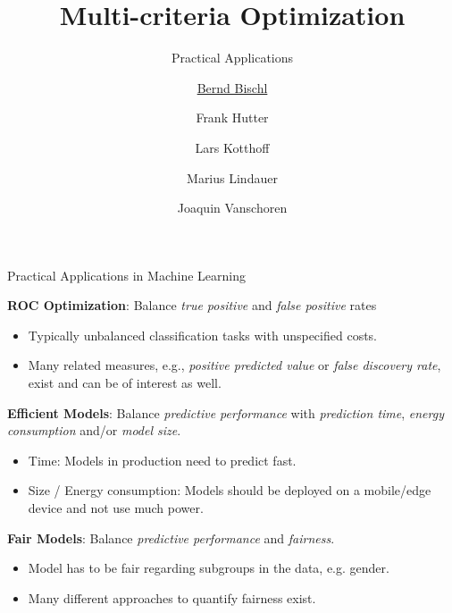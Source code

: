 


\newcommand{\q}[0]{\mathbf{q}}
\newcommand{\Xspace}[0]{\mathcal{X}}
\newcommand{\inducer}{\mathcal{I}}

\title[AutoML: Overview]{Multi-criteria Optimization}
\subtitle{Practical Applications}
\author[Bernd Bischl]{\underline{Bernd Bischl} \and Frank Hutter \and Lars Kotthoff\newline \and Marius Lindauer \and Joaquin Vanschoren}
\institute{}
\date{}






	\maketitle

\begin{frame}[allowframebreaks]{Practical Applications in Machine Learning}

    \textbf{ROC Optimization}: Balance \emph{true positive} and \emph{false positive} rates
  \begin{itemize}
    \item Typically unbalanced classification tasks with unspecified costs.
    \item Many related measures, e.g., \emph{positive predicted value} or \emph{false discovery rate}, exist and can be of interest as well.
  \end{itemize}

\textbf{Efficient Models}:
    Balance \emph{predictive performance} with \emph{prediction time}, \emph{energy consumption} and/or \emph{model size}.
  \begin{itemize}
    \item Time: Models in production need to predict fast.
    \item Size / Energy consumption: Models should be deployed on a mobile/edge device and not use much power.
  \end{itemize}

\textbf{Fair Models}:
  Balance \emph{predictive performance} and \emph{fairness}.
  \begin{itemize}
    \item Model has to be fair regarding subgroups in the data, e.g. gender.
    \item Many different approaches to quantify fairness exist.
  \end{itemize}

\end{frame}

